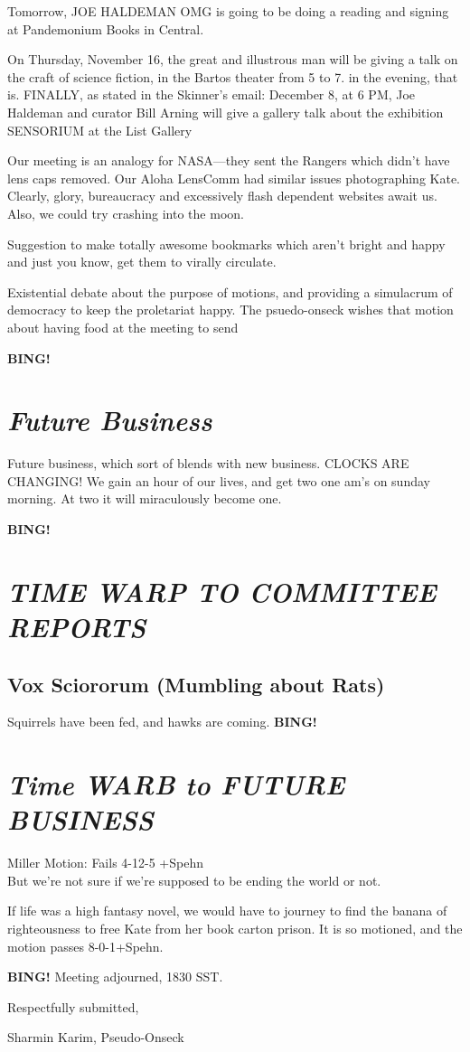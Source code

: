 \documentclass[10pt]{article}
\newcommand{\bing}{{\bf BING!} }
\newcommand{\goto}[1]{\bing \vskip 12pt \section*{{\em{#1}}}}
\begin{document}
Tomorrow, JOE HALDEMAN OMG is going to be doing a reading  and signing at Pandemonium Books in Central.

On Thursday, November 16, the great and illustrous man will be giving a
talk on the craft of science fiction, in the Bartos theater from 5 to
7. in the evening, that is.  FINALLY, as stated in the Skinner's
email: December 8, at 6 PM, Joe Haldeman and curator Bill Arning will
give a gallery talk about the exhibition SENSORIUM at the List Gallery

Our meeting is an analogy for NASA---they sent the Rangers which didn't
have lens caps removed. Our Aloha LensComm had similar issues
photographing Kate. Clearly, glory, bureaucracy and excessively flash
dependent websites await us. Also, we could try crashing into the
moon.

Suggestion to make totally awesome bookmarks which aren't bright and happy and just you know, get them to virally circulate.

Existential debate about the purpose of motions, and providing a
simulacrum of democracy to keep the proletariat happy. The
psuedo-onseck wishes that motion about having food at the meeting to
send

\goto{Future Business}
Future business, which sort of blends with new business.  CLOCKS ARE
CHANGING! We gain an hour of our lives, and get two one am's on sunday
morning. At two it will miraculously become one.

\goto{TIME WARP TO COMMITTEE REPORTS}
\subsection*{Vox Sciororum (Mumbling about Rats)}
Squirrels have been fed, and hawks are coming. 
\goto{Time WARB to FUTURE BUSINESS}

Miller Motion: Fails 4-12-5 +Spehn\\
But we're not sure if we're supposed to be ending the world or not.

If life was a high fantasy novel, we would have to journey to find the
banana of righteousness to free Kate from her book carton prison.
It is so motioned, and the motion passes  8-0-1+Spehn.

\bing
\noindent
Meeting adjourned, 1830 SST.

\vspace{18pt}

\centerline{Respectfully submitted,}
\centerline{Sharmin Karim, Pseudo-Onseck}
\end{document}
